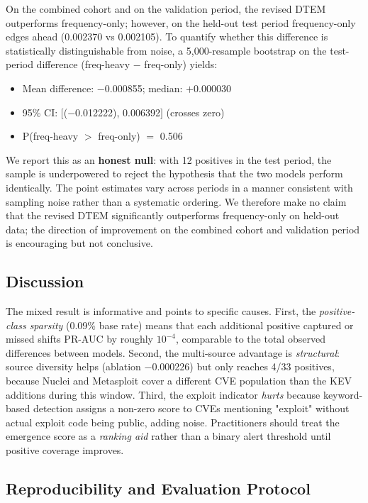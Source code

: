 \documentclass[conference]{IEEEtran}
\begin{document}
On the combined cohort and on the validation period, the revised DTEM outperforms frequency-only; however, on the held-out test period frequency-only edges ahead (0.002370 vs 0.002105). To quantify whether this difference is statistically distinguishable from noise, a 5{,}000-resample bootstrap on the test-period difference (freq-heavy $-$ freq-only) yields:
\begin{itemize}
\item Mean difference: $-$0.000855; median: $+$0.000030
\item 95\% CI: $[$($-$0.012222), 0.006392$]$ (crosses zero)
\item P(freq-heavy $>$ freq-only) $=$ 0.506
\end{itemize}

We report this as an \textbf{honest null}: with 12 positives in the test period, the sample is underpowered to reject the hypothesis that the two models perform identically. The point estimates vary across periods in a manner consistent with sampling noise rather than a systematic ordering. We therefore make no claim that the revised DTEM significantly outperforms frequency-only on held-out data; the direction of improvement on the combined cohort and validation period is encouraging but not conclusive.

\subsection{Discussion}

The mixed result is informative and points to specific causes. First, the \emph{positive-class sparsity} (0.09\% base rate) means that each additional positive captured or missed shifts PR-AUC by roughly $10^{-4}$, comparable to the total observed differences between models. Second, the multi-source advantage is \emph{structural}: source diversity helps (ablation $-$0.000226) but only reaches 4/33 positives, because Nuclei and Metasploit cover a different CVE population than the KEV additions during this window. Third, the exploit indicator \emph{hurts} because keyword-based detection assigns a non-zero score to CVEs mentioning "exploit" without actual exploit code being public, adding noise. Practitioners should treat the emergence score as a \emph{ranking aid} rather than a binary alert threshold until positive coverage improves.

\subsection{Reproducibility and Evaluation Protocol}
\end{document}
